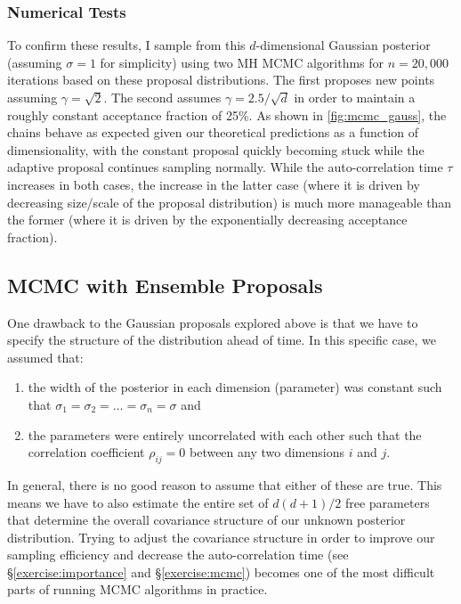 \documentclass[12pt, titlepage]{article}
\begin{document}
\subsubsection*{Numerical Tests} \label{subsubsec:sims_1}

To confirm these results, I sample from this $d$-dimensional
Gaussian posterior (assuming $\sigma=1$ for simplicity) using
two MH MCMC algorithms for $n=20,000$ iterations
based on these proposal distributions.
The first proposes new points 
assuming $\gamma=\sqrt{2}$. The second
assumes $\gamma=2.5/\sqrt{d}$ in order
to maintain a roughly constant acceptance fraction of 25\%. 
As shown in {\color{red} \autoref{fig:mcmc_gauss}}, the chains
behave as expected given our theoretical predictions as a function
of dimensionality, with the constant proposal quickly becoming stuck
while the adaptive proposal continues sampling normally. While
the auto-correlation time $\tau$ increases in both cases, 
the increase in the latter case (where it is driven by decreasing
size/scale of the proposal distribution)
is much more manageable than the former (where it is driven by
the exponentially decreasing acceptance fraction).

\subsection{MCMC with Ensemble Proposals} \label{subsec:mcmc_ensemble}

One drawback to the Gaussian proposals explored above is that
we have to specify the structure of the distribution ahead of time.
In this specific case, we assumed that:
\begin{enumerate}
    \item the width of the posterior in each dimension (parameter)
    was constant such that $\sigma_1 = \sigma_2 = \dots = \sigma_n = \sigma$ and
    \item the parameters were entirely uncorrelated with each other such that
    the correlation coefficient $\rho_{ij} = 0$ between any two dimensions
    $i$ and $j$.
\end{enumerate}

In general, there is no good reason to assume that either of these are true.
This means we have to also estimate the entire set of
$d(d+1)/2$ free parameters that determine the overall covariance
structure of our unknown posterior distribution.
Trying to adjust the covariance structure in order
to improve our sampling efficiency and decrease the auto-correlation
time (see \S\ref{exercise:importance} and \S\ref{exercise:mcmc})
becomes one of the most difficult parts of running MCMC algorithms in practice.
\end{document}
